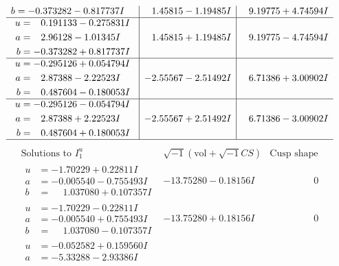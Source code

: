 \documentclass[1p]{elsarticle_modified}
\theoremstyle{definition}
\newcommand{\I}{\sqrt{-1}}
\begin{document}
$$\begin{array}{c|c|c}
\begin{aligned}
b &= -0.373282 - 0.817737 I\end{aligned}
 & \phantom{-}1.45815 - 1.19485 I & \phantom{-}9.19775 + 4.74594 I \\ \hline\begin{aligned}
u &= \phantom{-}0.191133 - 0.275831 I \\
a &= \phantom{-}2.96128 - 1.01345 I \\
b &= -0.373282 + 0.817737 I\end{aligned}
 & \phantom{-}1.45815 + 1.19485 I & \phantom{-}9.19775 - 4.74594 I \\ \hline\begin{aligned}
u &= -0.295126 + 0.054794 I \\
a &= \phantom{-}2.87388 - 2.22523 I \\
b &= \phantom{-}0.487604 - 0.180053 I\end{aligned}
 & -2.55567 - 2.51492 I & \phantom{-}6.71386 + 3.00902 I \\ \hline\begin{aligned}
u &= -0.295126 - 0.054794 I \\
a &= \phantom{-}2.87388 + 2.22523 I \\
b &= \phantom{-}0.487604 + 0.180053 I\end{aligned}
 & -2.55567 + 2.51492 I & \phantom{-}6.71386 - 3.00902 I\\
 \hline 
 \end{array}$$\newpage$$\begin{array}{c|c|c}  
\text{Solutions to }I^u_{1}& \I (\text{vol} + \sqrt{-1}CS) & \text{Cusp shape}\\
 \hline 
\begin{aligned}
u &= -1.70229 + 0.22811 I \\
a &= -0.005540 - 0.755493 I \\
b &= \phantom{-}1.037080 + 0.107357 I\end{aligned}
 & -13.75280 - 0.18156 I & \phantom{-0.000000 } 0 \\ \hline\begin{aligned}
u &= -1.70229 - 0.22811 I \\
a &= -0.005540 + 0.755493 I \\
b &= \phantom{-}1.037080 - 0.107357 I\end{aligned}
 & -13.75280 + 0.18156 I & \phantom{-0.000000 } 0 \\ \hline\begin{aligned}
u &= -0.052582 + 0.159560 I \\
a &= -5.33288 - 2.93386 I \\

\end{aligned}
\end{array}$$
\end{document}
